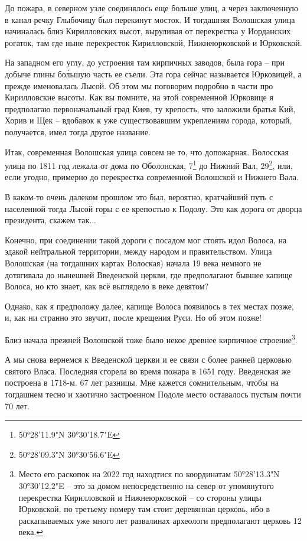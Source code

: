 До пожара, в северном узле соединялось еще больше улиц, а через заключенную в канал речку Глыбочицу был перекинут мосток. И тогдашняя Волошская улица начиналась близ Кирилловских высот, выруливая от перекрестка у Иорданских рогаток, там где ныне перекресток Кирилловской, Нижнеюрковской и Юрковской.

На западном его углу, до устроения там кирпичных заводов, была гора – при добыче глины бо\'льшую часть ее съели. Эта гора сейчас называется Юрковицей, а прежде именовалась Лысой. Об этом мы поговорим подробно в части про Кирилловские высоты. Как вы помните, на этой современной Юрковице я предполагаю первоначальный град Киев, ту крепость, что заложили братья Кий, Хорив и Щек – вдобавок к уже существовавшим укреплениям города, который, получается, имел тогда другое название.

Итак, современная Волошская улица совсем не то, что допожарная. Волосская улица по 1811 год лежала от дома по Оболонская, 7\footnote{50°28'11.9"N 30°30'18.7"E} до Нижний Вал, 29\footnote{50°28'09.3"N 30°30'56.6"E}, или, если угодно, примерно до перекрестка современной Волошской и Нижнего Вала.

В каком-то очень далеком прошлом это был, вероятно, кратчайший путь с населенной тогда Лысой горы с ее крепостью к Подолу. Это как дорога от дворца президента, скажем так...

Конечно, при соединении такой дороги с посадом мог стоять идол Волоса, на эдакой нейтральной территории, между народом и правительством. Улица Волошская (на тогдашних картах Волоская) начала 19 века немного не дотягивала до нынешней Введенской церкви, где предполагают бывшее капище Волоса, но кто знает, как всё выглядело в веке девятом?

Однако, как я предположу далее, капище Волоса появилось в тех местах позже, и, как ни странно это звучит, после крещения Руси. Но об этом позже!

Близ начала прежней Волошской тоже было некое древнее кирпичное строение\footnote{Место его раскопок на 2022 год находтися по координатам
50°28'13.3"N 30°30'12.2"E – это за домом непосредственно на север от упомянутого перекрестка Кирилловской и Нижнеюрковской – со стороны улицы Юрковской, по третьему номеру там стоит деревянная церковь, ибо в раскапываемых уже много лет развалинах археологи предполагают церковь 12 века.}. 

А мы снова вернемся к Введенской церкви и ее связи с более ранней церковью святого Власа. Последняя сгорела во время пожара в 1651 году. Введенская же построена в 1718-м. 67 лет разницы. Мне кажется сомнительным, чтобы на тогдашнем тесно и хаотично застроенном Подоле место оставалось пустым почти 70 лет. 

